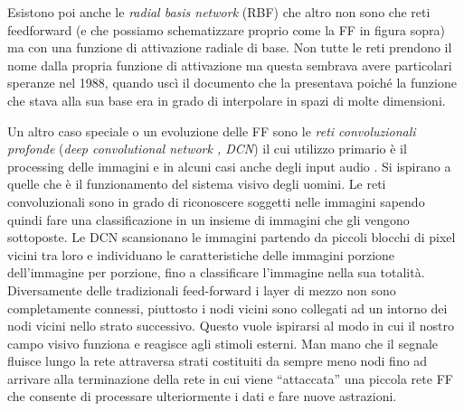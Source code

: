 Esistono poi anche le \textit{radial basis network} (RBF) che altro non sono che reti feedforward (e che possiamo schematizzare proprio come la FF in figura sopra) ma con una funzione di attivazione radiale di base. Non tutte le reti prendono il nome dalla propria funzione di attivazione ma questa sembrava avere particolari speranze nel 1988, quando uscì il documento che la presentava poiché la funzione che stava alla sua base era in grado di interpolare in spazi di molte dimensioni\cite{broomhead1988radial}.
 
Un altro caso speciale o un evoluzione delle FF sono le \textit{reti convoluzionali profonde} (\textit{deep convolutional network , DCN}) il cui utilizzo primario è il processing delle immagini e in alcuni casi anche degli input audio \cite{lecun1998gradient}. Si ispirano a quelle che è il funzionamento del sistema visivo degli uomini.
Le reti convoluzionali sono in grado di riconoscere soggetti nelle immagini sapendo quindi fare una classificazione in un insieme di immagini che gli vengono sottoposte. Le DCN scansionano le immagini partendo da piccoli blocchi di pixel vicini tra loro e individuano le caratteristiche delle immagini porzione dell'immagine per porzione, fino a classificare l'immagine nella sua totalità.
Diversamente delle tradizionali feed-forward i layer di mezzo non sono completamente connessi, piuttosto i nodi vicini sono collegati ad un intorno dei nodi vicini nello strato successivo. Questo vuole ispirarsi al modo in cui il nostro campo visivo funziona e reagisce agli stimoli esterni. Man mano che il segnale fluisce lungo la rete attraversa strati costituiti da sempre meno nodi fino ad arrivare alla terminazione della rete in cui viene ``attaccata'' una piccola rete FF che consente di processare ulteriormente i dati e fare nuove astrazioni.

